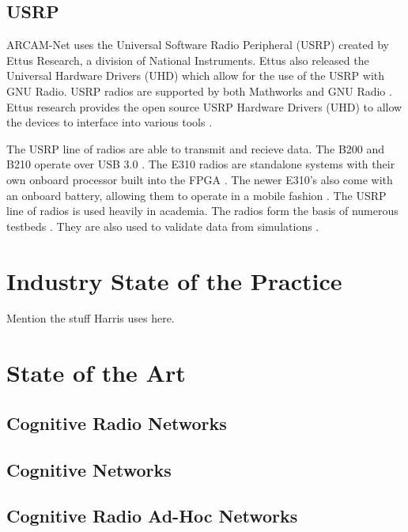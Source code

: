 \subsection{USRP}

ARCAM-Net uses the Universal Software Radio Peripheral (USRP) created by Ettus Research, a division of National Instruments\cite{0006}. Ettus also released the Universal Hardware Drivers (UHD) \cite{0007} which allow for the use of the USRP with GNU Radio. USRP radios are supported by both Mathworks \cite{0027} and GNU Radio \cite{0026}. Ettus research provides the open source USRP Hardware Drivers (UHD) to allow the devices to interface into various tools \cite{0007}.

The USRP line of radios are able to transmit and recieve data. The B200 and B210 operate over USB 3.0 \cite{0034}. The E310 radios are standalone systems with their own onboard processor built into the FPGA \cite{0035}. The newer E310's also come with an onboard battery, allowing them to operate in a mobile fashion \cite{0036}. The USRP line of radios is used heavily in academia. The radios form the basis of numerous testbeds  \cite{4753441} \cite{4212821}. They are also used to validate data from simulations \cite{5508221}. 

\section{Industry State of the Practice}

Mention the stuff Harris uses here.


\section{State of the Art}

\subsection{Cognitive Radio Networks}

\subsection{Cognitive Networks}

\subsection{Cognitive Radio Ad-Hoc Networks}

